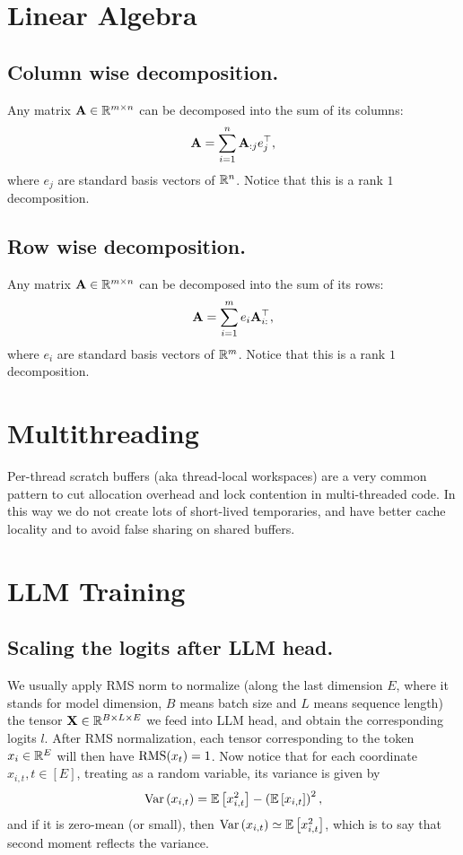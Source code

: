 \documentclass[11pt]{article}  %
\begin{document}
\section{Linear Algebra}


\subsection{Column wise decomposition.}
Any matrix $\mathbf{A} \in \mathbb{R}^{m \times n}$ can be decomposed into the sum of its columns: 
\begin{align}
	\mathbf{A} = \sum_{i=1}^{n} \mathbf{A}_{:j} e_j^{\top},
\end{align}
where $e_j$ are standard basis vectors of $\mathbb{R}^n$.
Notice that this is a rank $1$ decomposition.

\subsection{Row wise decomposition.}
Any matrix $\mathbf{A} \in \mathbb{R}^{m \times n}$ can be decomposed into the sum of its rows: 
\begin{align}
	\mathbf{A} = \sum_{i=1}^{m} e_i \mathbf{A}_{i:}^{\top},
\end{align}
where $e_i$ are standard basis vectors of $\mathbb{R}^m$.
Notice that this is a rank $1$ decomposition.


\section{Multithreading}
Per-thread scratch buffers (aka thread-local workspaces) are a very common pattern to cut allocation overhead and lock contention in multi-threaded code.
In this way we do not create lots of short-lived temporaries, and have better cache locality and to avoid false sharing on shared buffers.


\section{LLM Training}
\subsection{Scaling the logits after LLM head.}
We usually apply RMS norm to normalize (along the last dimension $E$, where it stands for model dimension, $B$ means batch size and $L$ means sequence length) the tensor $\mathbf{X} \in \mathbb{R}^{B \times L \times E}$ we feed into LLM head, and obtain the corresponding logits $l$.
After RMS normalization, each tensor corresponding to the token $x_i \in \mathbb{R}^E$ will then have ${\rm RMS}(x_t) = 1$.
Now notice that for each coordinate $x_{i, t}, t\in[E]$, treating as a random variable, its variance is given by 
\begin{align}
  \operatorname{Var}\left( x_{i, t} \right) = \mathbb{E}\left[x^2_{i, t}\right] - \left( \mathbb{E}\left[x_{i, t}\right] \right)^2,
\end{align}
and if it is zero-mean (or small), then $\operatorname{Var}\left( x_{i, t} \right) \simeq \mathbb{E}\left[x^2_{i, t}\right]$, which is to say that second moment reflects the variance.
\end{document}
